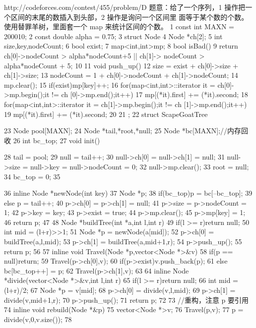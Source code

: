 \documentclass[11pt]{article}
\begin{document}
\begin{Code}
    http://codeforces.com/contest/455/problem/D
    题意：给了一个序列，1 操作把一个区间的末尾的数插入到头部，2 操作是询问一个区间里
    面等于某个数的个数。
    使用替罪羊树，里面套一个 map 来统计区间的个数。
 1 const int MAXN = 200010;
 2 const double alpha = 0.75;
 3 struct Node{
 4     Node *ch[2];
 5     int size,key,nodeCount;
 6     bool exist;
 7     map<int,int>mp;
 8     bool isBad(){
 9         return ch[0]->nodeCount > alpha*nodeCount+5 || ch[1]->
              nodeCount > alpha*nodeCount + 5;
10     }
11     void push_up(){
12         size = exist + ch[0]->size + ch[1]->size;
13         nodeCount = 1 + ch[0]->nodeCount + ch[1]->nodeCount;
14         mp.clear();
15         if(exist)mp[key]++;
16         for(map<int,int>::iterator it = ch[0]->mp.begin();it != ch
              [0]->mp.end();it++)
17              mp[(*it).first] += (*it).second;
18         for(map<int,int>::iterator it = ch[1]->mp.begin();it != ch
              [1]->mp.end();it++)
19              mp[(*it).first] += (*it).second;
20     }
21 };
22 struct ScapeGoatTree{
23     Node pool[MAXN];
24     Node *tail,*root,*null;
25     Node *bc[MAXN];//内存回收
26     int bc_top;
27     void init(){


28              tail = pool;
29              null = tail++;
30              null->ch[0] = null->ch[1] = null;
31              null->size = null->key = null->nodeCount = 0;
32              null->mp.clear();
33              root = null;
34              bc_top = 0;
35       }
36       inline Node *newNode(int key){
37           Node *p;
38           if(bc_top)p = bc[--bc_top];
39           else p = tail++;
40           p->ch[0] = p->ch[1] = null;
41           p->size = p->nodeCount = 1;
42           p->key = key;
43           p->exist = true;
44           p->mp.clear();
45           p->mp[key] = 1;
46           return p;
47       }
48       Node *buildTree(int *a,int l,int r){
49           if(l >= r)return null;
50           int mid = (l+r)>>1;
51           Node *p = newNode(a[mid]);
52           p->ch[0] = buildTree(a,l,mid);
53           p->ch[1] = buildTree(a,mid+1,r);
54           p->push_up();
55           return p;
56       }
57       inline void Travel(Node *p,vector<Node *>&v){
58           if(p == null)return;
59           Travel(p->ch[0],v);
60           if(p->exist)v.push_back(p);
61           else bc[bc_top++] = p;
62           Travel(p->ch[1],v);
63       }
64       inline Node *divide(vector<Node *>&v,int l,int r){
65           if(l >= r)return null;
66           int mid = (l+r)/2;
67           Node *p = v[mid];
68           p->ch[0] = divide(v,l,mid);
69           p->ch[1] = divide(v,mid+1,r);
70           p->push_up();
71           return p;
72       }
73       //重构，注意 p 要引用
74       inline void rebuild(Node *&p){
75           vector<Node *>v;
76           Travel(p,v);
77           p = divide(v,0,v.size());
78       }


}
\end{Code}
\end{document}
